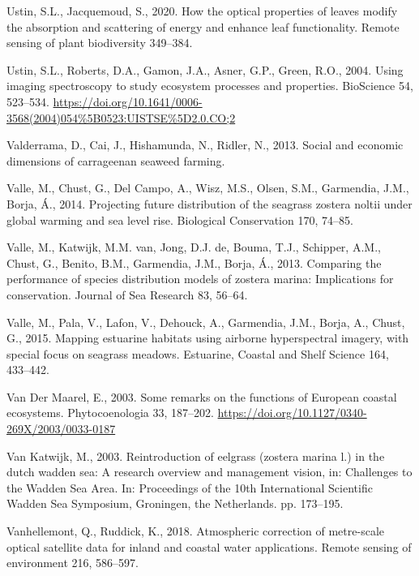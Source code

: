 \documentclass[
  letterpaper,
  11pt,
  english,
  singlespacing,
  headsepline]{MastersDoctoralThesis}
\newlength{\cslhangindent}
\newenvironment{CSLReferences}[2] %
 {\begin{list}{}{%
  \setlength{\itemindent}{0pt}
  \setlength{\leftmargin}{0pt}
  \setlength{\parsep}{0pt}
  \ifodd #1
   \setlength{\leftmargin}{\cslhangindent}
   \setlength{\itemindent}{-1\cslhangindent}
  \fi
  \setlength{\itemsep}{#2\baselineskip}}}
 {\end{list}}
\begin{document}
\begin{CSLReferences}{1}{0}
Ustin, S.L., Jacquemoud, S., 2020. How the optical properties of leaves
modify the absorption and scattering of energy and enhance leaf
functionality. Remote sensing of plant biodiversity 349--384.

Ustin, S.L., Roberts, D.A., Gamon, J.A., Asner, G.P., Green, R.O., 2004.
{Using imaging spectroscopy to study ecosystem processes and
properties}. BioScience 54, 523--534.
\url{https://doi.org/10.1641/0006-3568(2004)054\%5B0523:UISTSE\%5D2.0.CO;2}

Valderrama, D., Cai, J., Hishamunda, N., Ridler, N., 2013. Social and
economic dimensions of carrageenan seaweed farming.

Valle, M., Chust, G., Del Campo, A., Wisz, M.S., Olsen, S.M., Garmendia,
J.M., Borja, Á., 2014. Projecting future distribution of the seagrass
zostera noltii under global warming and sea level rise. Biological
Conservation 170, 74--85.

Valle, M., Katwijk, M.M. van, Jong, D.J. de, Bouma, T.J., Schipper,
A.M., Chust, G., Benito, B.M., Garmendia, J.M., Borja, Á., 2013.
Comparing the performance of species distribution models of zostera
marina: Implications for conservation. Journal of Sea Research 83,
56--64.

Valle, M., Pala, V., Lafon, V., Dehouck, A., Garmendia, J.M., Borja, A.,
Chust, G., 2015. Mapping estuarine habitats using airborne hyperspectral
imagery, with special focus on seagrass meadows. Estuarine, Coastal and
Shelf Science 164, 433--442.

Van Der Maarel, E., 2003. {Some remarks on the functions of European
coastal ecosystems}. Phytocoenologia 33, 187--202.
\url{https://doi.org/10.1127/0340-269X/2003/0033-0187}

Van Katwijk, M., 2003. Reintroduction of eelgrass (zostera marina l.) in
the dutch wadden sea: A research overview and management vision, in:
Challenges to the Wadden Sea Area. In: Proceedings of the 10th
International Scientific Wadden Sea Symposium, Groningen, the
Netherlands. pp. 173--195.

Vanhellemont, Q., Ruddick, K., 2018. Atmospheric correction of
metre-scale optical satellite data for inland and coastal water
applications. Remote sensing of environment 216, 586--597.


\end{CSLReferences}
\end{document}
